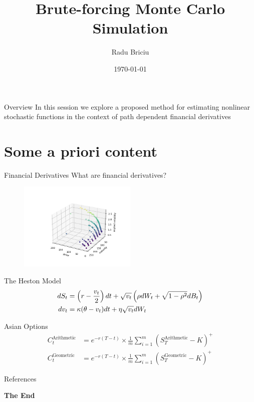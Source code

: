 \documentclass[aspectratio=169,xcolor=dvipsnames]{beamer}
\title{Brute-forcing Monte Carlo Simulation}
\author{Radu Briciu}
\institute
{
	BSc Finance (Hons) \\ 
	University of Westminster \\
	\vspace*{1em}
	City, University of London \\
	Faculty of Finance
}
\date{\today} %
\begin{document}
	
	\begin{frame}
		\titlepage
	\end{frame}
	
	\begin{frame}{Overview}
		In this session we explore a proposed method for estimating nonlinear stochastic functions in the context of path dependent financial derivatives
		\tableofcontents
	\end{frame}
	
	\section{Some a priori content}
	
	\begin{frame}{Financial Derivatives}
		What are financial derivatives?
		\begin{figure}[h]
			\centering
			\includegraphics[width=0.5\textwidth]{vix.png}
		\end{figure}
	\end{frame}
	
	\begin{frame}{The Heston Model}
		\begin{align}
			dS_t &= \left( r - \frac{v_t}{2} \right) dt + \sqrt{v_t} \left( \rho dW_t + \sqrt{1 - \rho^2} dB_t \right) \label{eq:hdXt} \\
			dv_t &= \kappa (\theta - v_t) dt + \eta \sqrt{v_t} dW_t \hspace{1.8cm} \label{eq:hdvt}
		\end{align}
	\end{frame}
	
	\begin{frame}{Asian Options}
		\begin{align}
			C^{\text{Arithmetic}}_t &= e^{-r(T-t)} \times \frac{1}{m} \sum_{i=1}^{m} (S_{T}^{\text{Arithmetic}} - K)^{+} \\
			C^{\text{Geometric}}_t &= e^{-r(T-t)} \times \frac{1}{m} \sum_{i=1}^{m} (S_{T}^{\text{Geometric}} - K)^{+}
		\end{align} \label{eq:AsianPayoffs}
	\end{frame}
	
	\begin{frame}{References}
		\nocite{*}
		\printbibliography
	\end{frame}
	
	
	\begin{frame}
		\Huge{\centerline{\textbf{The End}}}
	\end{frame}
	
	
\end{document}
